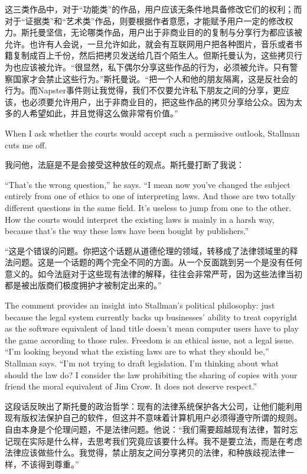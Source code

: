 \ifdefined\chs
这三类作品中，对于``功能类''的作品，用户应该无条件地具备修改它们的权利；而对于``证据类''和``艺术类''作品，则要根据作者意愿，才能赋予用户一定的修改权力。斯托曼坚信，无论哪类作品，用户出于非商业目的的复制与分享行为都应该被允许。也许有人会说，一旦允许如此，就会有互联网用户把各种图片，音乐或者书籍复制成百上千份，然后把拷贝发送给几百个陌生人。但斯托曼认为，这些拷贝行为也应该被允许。``很显然，私下偶尔分享这些作品的行为，必须被允许。只有警察国家才会禁止这些行为。''斯托曼说。``把一个人和他的朋友隔离，这是反社会的行为。而Napster事件则让我觉得，我们不仅要允许私下朋友之间的分享，更应该，也必须要允许用户，出于非商业目的，把这些作品的拷贝分享给公众。因为太多的人希望如此，并且觉得这么做非常有价值。''
\fi

\ifdefined\eng
When I ask whether the courts would accept such a permissive outlook, Stallman cuts me off.
\fi

\ifdefined\chs
我问他，法庭是不是会接受这种放任的观点。斯托曼打断了我说：
\fi

\ifdefined\eng
``That's the wrong question,'' he says. ``I mean now you've changed the subject entirely from one of ethics to one of interpreting laws. And those are two totally different questions in the same field. It's useless to jump from one to the other. How the courts would interpret the existing laws is mainly in a harsh way, because that's the way these laws have been bought by publishers.''
\fi

\ifdefined\chs
``这是个错误的问题。你把这个话题从道德伦理的领域，转移成了法律领域里的释法问题。这是一个话题的两个完全不同的方面。从一个反面跳到另一个是没有任何意义的。如今法庭对于这些现有法律的解释，往往会非常严苛，因为这些法律当初都是被出版商们极度拥护才被制定出来的。''
\fi

\ifdefined\eng
The comment provides an insight into Stallman's political philosophy: just because the legal system currently backs up businesses' ability to treat copyright as the software equivalent of land title doesn't mean computer users have to play the game according to those rules. Freedom is an ethical issue, not a legal issue. ``I'm looking beyond what the existing laws are to what they should be,'' Stallman says. ``I'm not trying to draft legislation. I'm thinking about what should the law do? I consider the law prohibiting the sharing of copies with your friend the moral equivalent of Jim Crow. It does not deserve respect.''
\fi

\ifdefined\chs
这段话反映出了斯托曼的政治哲学：现有的法律系统保护各大公司，让他们能利用现有版权法保护自己的软件，但这并不意味着计算机用户必须得遵守所谓的规则。自由本身是个伦理问题，不是法律问题。他说：``我们需要超越现有法律，暂时忘记现在实际是什么样，去思考我们究竟应该要什么样。我不是要立法，而是在考虑法律应该做些什么。我觉得，禁止朋友之间分享拷贝的法律，和种族歧视法律一样，不该得到尊重。''
\fi

